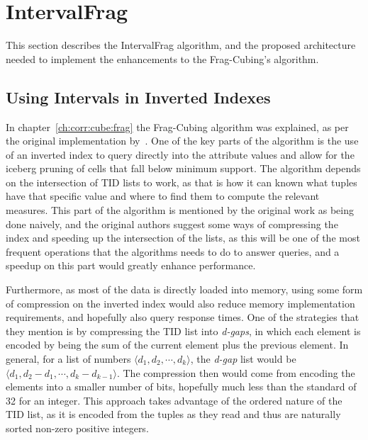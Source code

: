 
\chapter{IntervalFrag}\label{ch:interval}

This section describes the IntervalFrag algorithm, and the proposed architecture needed to implement the enhancements to the Frag-Cubing's algorithm.

\section{Using Intervals in Inverted Indexes}\label{ch:interval:problem}

In chapter~\ref{ch:corr:cube:frag} the Frag-Cubing algorithm was explained, as per the original implementation by~\cite{liHighdimensionalOLAPMinimal2004}.
One of the key parts of the algorithm is the use of an inverted index to query directly into the attribute values and allow for the iceberg pruning of cells that fall below minimum support.
The algorithm depends on the intersection of TID lists to work, as that is how it can known what tuples have that specific value and where to find them to compute the relevant measures.
This part of the algorithm is mentioned by the original work as being done naively, and the original authors suggest some ways of compressing the index and speeding up the intersection of the lists, as this will be one of the most frequent operations that the algorithms needs to do to answer queries, and a speedup on this part would greatly enhance performance.

Furthermore, as most of the data is directly loaded into memory, using some form of compression on the inverted index would also reduce memory implementation requirements, and hopefully also query response times.
One of the strategies that they mention is by compressing the TID list into \textit{d-gaps}, in which each element is encoded by being the sum of the current element plus the previous element.
In general, for a list of numbers $\langle d_1, d_2 , \cdots, d_k \rangle$, the \textit{d-gap} list would be $\langle d_1 , d_2 - d_1 , \cdots, d_k - d_{k - 1} \rangle$.
The compression then would come from encoding the elements into a smaller number of bits, hopefully much less than the standard of 32 for an integer.
This approach takes advantage of the ordered nature of the TID list, as it is encoded from the tuples as they read and thus are naturally sorted non-zero positive integers.

